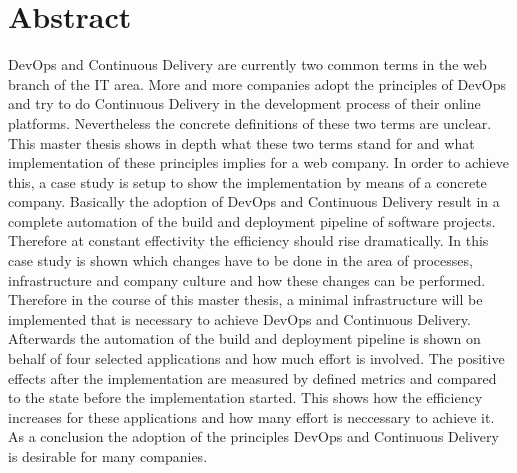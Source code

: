 \section*{Abstract}
DevOps and Continuous Delivery are currently two common terms in the web branch of the IT area. More and more companies adopt the principles of DevOps and try to do Continuous Delivery in the development process of their online platforms. Nevertheless the concrete definitions of these two terms are unclear. This master thesis shows in depth what these two terms stand for and what implementation of these principles implies for a web company. In order to achieve this, a case study is setup to show the implementation by means of a concrete company. Basically the adoption of DevOps and Continuous Delivery result in a complete automation of the build and deployment pipeline of software projects. Therefore at constant effectivity the efficiency should rise dramatically. In this case study is shown which changes have to be done in the area of processes, infrastructure and company culture and how these changes can be performed. Therefore in the course of this master thesis, a minimal infrastructure will be implemented that is necessary to achieve DevOps and Continuous Delivery. Afterwards the automation of the build and deployment pipeline is shown on behalf of four selected applications and how much effort is involved. The positive effects after the implementation are measured by defined metrics and compared to the state before the implementation started. This shows how the efficiency increases for these applications and how many effort is neccessary to achieve it. As a conclusion the adoption of the principles DevOps and Continuous Delivery is desirable for many companies.